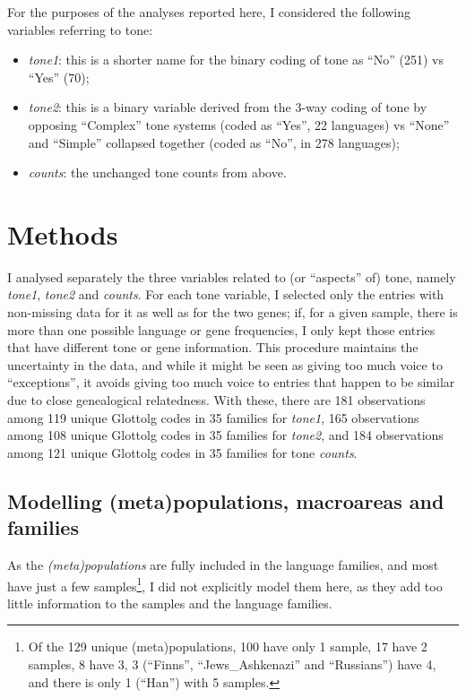 \documentclass[twoside,twocolumn]{article}
\begin{document}
For the purposes of the analyses reported here, I considered the following variables referring to tone:

\begin{itemize}
  \item \emph{tone1}: this is a shorter name for the binary coding of tone as ``No'' (251) vs ``Yes'' (70);
  \item \emph{tone2}: this is a binary variable derived from the 3-way coding of tone by opposing ``Complex'' tone systems (coded as ``Yes'', 22 languages) vs ``None'' and ``Simple'' collapsed together (coded as ``No'', in 278 languages);
  \item \emph{counts}: the unchanged tone counts from above.
\end{itemize}




\section{Methods}

I analysed separately the three variables related to (or ``aspects'' of) tone, namely \textit{tone1}, \textit{tone2} and \textit{counts}.
For each tone variable, I selected only the entries with non-missing data for it as well as for the two genes; if, for a given sample, there is more than one possible language or gene frequencies, I only kept those entries that have different tone or gene information.
This procedure maintains the uncertainty in the data, and while it might be seen as giving too much voice to ``exceptions'', it avoids giving too much voice to entries that happen to be similar due to close genealogical relatedness.
With these, there are 181 observations among 119 unique Glottolg codes in 35 families for \textit{tone1}, 165 observations among 108 unique Glottolg codes in 35 families for \textit{tone2}, and 184 observations among 121 unique Glottolg codes in 35 families for tone \textit{counts}.


\subsection{Modelling (meta)populations, macroareas and families}

As the \emph{(meta)populations} are fully included in the language families, and most have just a few samples\footnote{Of the 129 unique (meta)populations, 100 have only 1 sample, 17 have 2 samples, 8 have 3, 3 (``Finns'', ``Jews\_Ashkenazi'' and ``Russians'') have 4, and there is only 1 (``Han'') with 5 samples.}, I did not explicitly model them here, as they add too little information to the samples and the language families.
\end{document}
